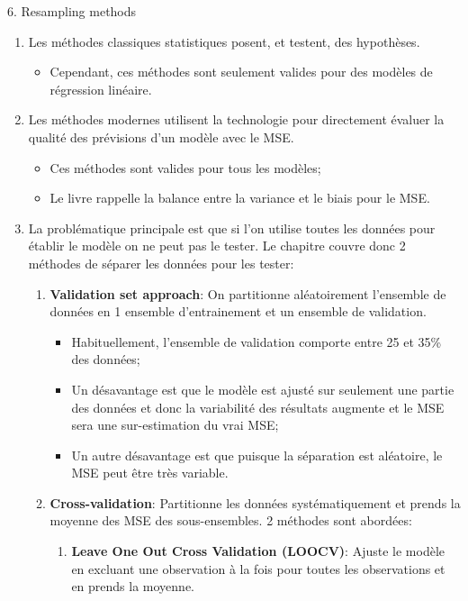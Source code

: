 \documentclass[12pt, titlepage, french]{report}
\begin{document}
\begin{CHPT_SUMM}[label = {VALID-RESAMPLING}]{6. Resampling methods}
\begin{enumerate}
	\item	Les méthodes classiques statistiques posent, et testent, des hypothèses.
	\begin{itemize}
		\item	Cependant, ces méthodes sont seulement valides pour des modèles de régression linéaire.
	\end{itemize}
	\item	Les méthodes modernes utilisent la technologie pour directement évaluer la qualité des prévisions d'un modèle avec le MSE.
	\begin{itemize}
		\item	Ces méthodes sont valides pour tous les modèles;
		\item	Le livre rappelle la balance entre la variance et le biais pour le MSE.
	\end{itemize}
	\item	La problématique principale est que si l'on utilise toutes les données pour établir le modèle on ne peut pas le tester. Le chapitre couvre donc 2 méthodes de séparer les données pour les tester:
	\begin{enumerate}
		\item	\textbf{Validation set approach}: On partitionne aléatoirement l'ensemble de données en 1 ensemble d'entrainement et un ensemble de validation.
		\begin{itemize}
			\item	Habituellement, l'ensemble de validation comporte entre 25 et 35\% des données;
			\item	Un désavantage est que le modèle est ajusté sur seulement une partie des données et donc la variabilité des résultats augmente et le MSE sera une sur-estimation du vrai MSE;
			\item	Un autre désavantage est que puisque la séparation est aléatoire, le MSE peut être très variable.
		\end{itemize}
		\item	\textbf{Cross-validation}: Partitionne les données systématiquement et prends la moyenne des MSE des sous-ensembles. 2 méthodes sont abordées:
		\begin{enumerate}
			\item	\textbf{Leave One Out Cross Validation (LOOCV)}: Ajuste le modèle en excluant une observation à la fois pour toutes les observations et en prends la moyenne.

\end{enumerate}
\end{enumerate}
\end{enumerate}
\end{CHPT_SUMM}
\end{document}

